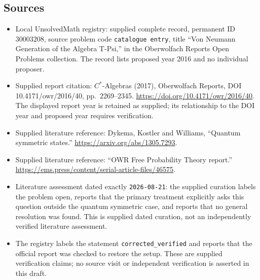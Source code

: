 \documentclass[11pt]{article}
\begin{document}
\subsection{Sources}
\begin{itemize}
\item Local UnsolvedMath registry: supplied complete record, permanent ID \(30003208\), source problem code \texttt{catalogue entry}, title ``Von Neumann Generation of the Algebra T-Psi,'' in the Oberwolfach Reports Open Problems collection. The record lists proposed year 2016 and no individual proposer.
\item Supplied report citation: \(C^*\)-Algebras (2017), Oberwolfach Reports, DOI 10.4171/owr/2016/40, pp.\ 2269--2345. \url{https://doi.org/10.4171/owr/2016/40}. The displayed report year is retained as supplied; its relationship to the DOI year and proposed year requires verification.
\item Supplied literature reference: Dykema, Kostler and Williams, ``Quantum symmetric states.'' \url{https://arxiv.org/abs/1305.7293}.
\item Supplied literature reference: ``OWR Free Probability Theory report.'' \url{https://ems.press/content/serial-article-files/46575}.
\item Literature assessment dated exactly \texttt{2026-08-21}: the supplied curation labels the problem open, reports that the primary treatment explicitly asks this question outside the quantum symmetric case, and reports that no general resolution was found. This is supplied dated curation, not an independently verified literature assessment.
\item The registry labels the statement \texttt{corrected\_verified} and reports that the official report was checked to restore the setup. These are supplied verification claims; no source visit or independent verification is asserted in this draft.
\end{itemize}
\end{document}
